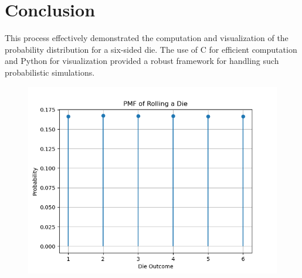 \documentclass[journal]{IEEEtran}
\begin{document}
\section*{Conclusion}
This process effectively demonstrated the computation and visualization of the probability distribution for a six-sided die. The use of C for efficient computation and Python for visualization provided a robust framework for handling such probabilistic simulations.
\begin{figure}[h!]
   \centering
   \includegraphics[width=\columnwidth]{figs/Figure_1.png}
\end{figure}
\end{document}
